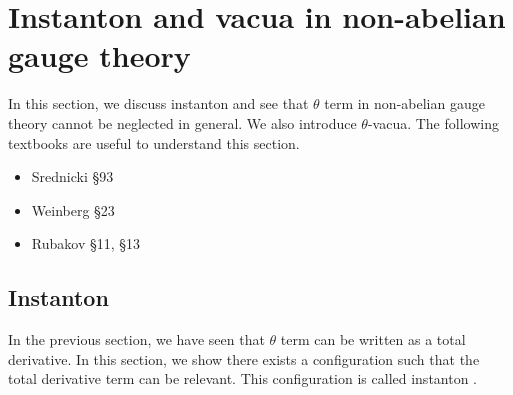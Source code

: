 \documentclass[11pt,a4paper]{article}
\begin{document}
\section{Instanton and vacua in non-abelian gauge theory}\label{sec:instanton}
In this section, we discuss instanton and see that $\theta$ term in non-abelian gauge theory cannot be neglected in general. We also introduce $\theta$-vacua.
The following textbooks are useful to understand this section.
\begin{itemize}
\item Srednicki \cite{Srednicki:2007qs} \S 93
\item Weinberg \cite{Weinberg:1996kr} \S 23
\item Rubakov \cite{Rubakov:2002fi} \S 11, \S 13
\end{itemize}


\subsection{Instanton}
In the previous section, we have seen that $\theta$ term can be written as a total derivative. In this section, we show there exists a configuration such that the total derivative term can be relevant. This configuration is called instanton \cite{Belavin:1975fg}.
\end{document}
